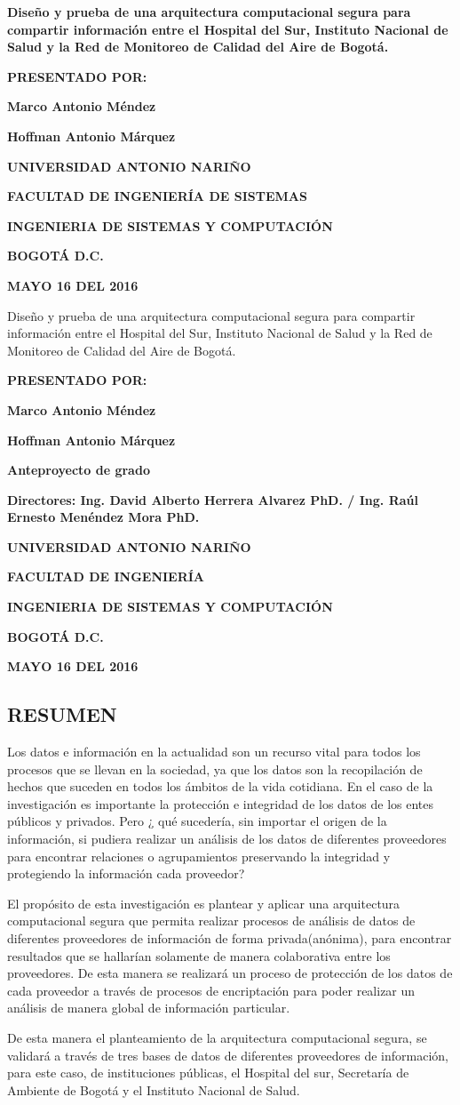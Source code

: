 \documentclass[a4paper, 11pt, oneside]{article}
\theoremstyle{definition}
\theoremstyle{remark}
\newcommand\portada{
\begin{titlepage}
		\begin{center}
			{\large \bf Diseño y prueba de una arquitectura computacional segura para compartir información entre el Hospital del Sur, Instituto Nacional de Salud y la Red de Monitoreo de Calidad del Aire de Bogotá.}
            
			\vfill
 			{\large\bf PRESENTADO POR: \par}
			{\large\bf Marco Antonio Méndez \par}
            {\large\bf Hoffman Antonio Márquez}
			\vfill
			{\large\bf UNIVERSIDAD ANTONIO NARIÑO  \par}
			{\large\bf FACULTAD DE INGENIERÍA DE SISTEMAS \par}
			{\large\bf INGENIERIA DE SISTEMAS Y COMPUTACIÓN \par}
			{\large\bf BOGOTÁ D.C.\par}
			{\large\bf MAYO 16 DEL 2016 \par}
		\end{center}
\end{titlepage}
}
\newcommand\contraportada{
	\begin{titlepage}
		\begin{center}
{Diseño y prueba de una arquitectura computacional segura para compartir información entre el Hospital del Sur, Instituto Nacional de Salud y la Red de Monitoreo de Calidad del Aire de Bogotá.} 
			\vfill
 			{\large\bf PRESENTADO POR: \par}
			{\large\bf Marco Antonio Méndez \par}
            {\large\bf Hoffman Antonio Márquez}
			\vfill
			{\large\bf Anteproyecto de grado \par}
			\vfill
			{\large\bf Directores: Ing. David Alberto Herrera Alvarez PhD. / Ing. Raúl Ernesto Menéndez Mora PhD. 
\par}
			\vfill
			{\large\bf UNIVERSIDAD ANTONIO NARIÑO \par}
			{\large\bf FACULTAD DE INGENIERÍA \par}
			{\large\bf INGENIERIA DE SISTEMAS Y COMPUTACIÓN \par}
			{\large\bf BOGOTÁ D.C.\par}
			{\large\bf MAYO 16 DEL 2016 \par}
		\end{center}
\end{titlepage}
}
\begin{document}
\portada
\contraportada
 




\renewcommand\contentsname{\centering TABLA DE CONTENIDOS}
\tableofcontents
\clearpage





\renewcommand{\thesection}{}
\renewcommand{\thesubsection}{\arabic{section}.\arabic{subsection}}
\makeatletter
\def\@seccntformat#1{\csname #1ignore\expandafter\endcsname\csname the#1\endcsname\quad}
\let\sectionignore\@gobbletwo
\let\latex@numberline\numberline
\def\numberline#1{\if\relax#1\relax\else\latex@numberline{#1}\fi}
\makeatother

\begin{center}
 \section{RESUMEN}
 \end{center}
 
Los datos e información en la actualidad son un recurso vital para todos los procesos que se llevan en la sociedad, ya que los datos son la recopilación de hechos que suceden en todos los ámbitos de la vida cotidiana. En el caso de la investigación es importante la protección e integridad de los datos de los entes públicos y privados. Pero ¿ qué sucedería, sin importar el origen de la información, si pudiera realizar un análisis de los datos de diferentes proveedores para encontrar relaciones o agrupamientos preservando la integridad y protegiendo la información cada proveedor?

El propósito de esta investigación es plantear y aplicar una arquitectura computacional segura que permita realizar procesos de análisis de datos de diferentes proveedores de información de forma privada(anónima), para encontrar resultados que se  hallarían solamente de manera colaborativa entre los proveedores. De esta manera se realizará un proceso de protección de los datos de cada proveedor a través de procesos de encriptación para poder realizar un análisis de manera global de información particular. 

De esta manera el planteamiento de la arquitectura computacional segura, se validará a través de tres bases de datos de diferentes proveedores de información, para este caso, de instituciones públicas, el Hospital del sur, Secretaría de Ambiente de Bogotá y el Instituto Nacional de Salud.
 \clearpage
 
\end{document}
